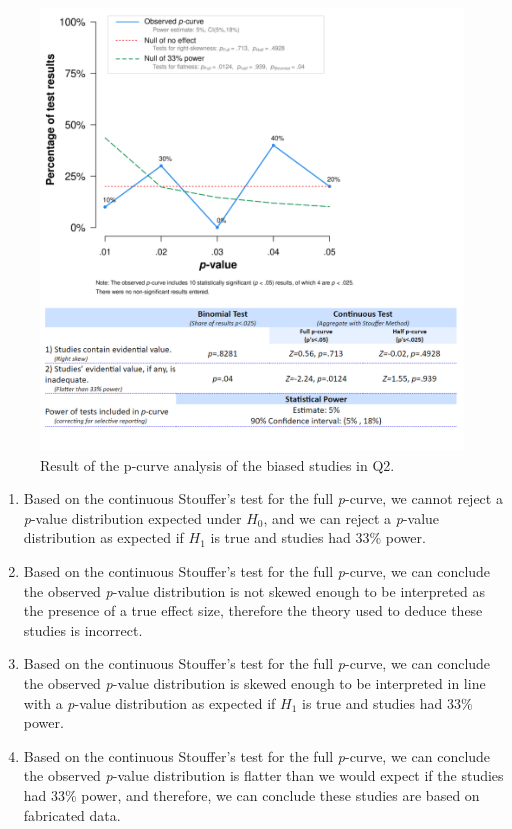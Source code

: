 \documentclass[
  oneside]{krantz}
\providecommand{\tightlist}{%
  \setlength{\itemsep}{0pt}\setlength{\parskip}{0pt}}
\begin{document}
\begin{figure}

{\centering \includegraphics[width=1\linewidth]{images/pcurveresultq5} 

}

\caption{Result of the p-curve analysis of the biased studies in Q2.}\label{fig:pcurveresultq5}
\end{figure}

\begin{enumerate}
\def\labelenumi{\Alph{enumi})}
\tightlist
\item
  Based on the continuous Stouffer's test for the full \emph{p}-curve, we cannot reject a \emph{p}-value distribution expected under \(H_0\), and we can reject a \emph{p}-value distribution as expected if \(H_1\) is true and studies had 33\% power.
\item
  Based on the continuous Stouffer's test for the full \emph{p}-curve, we can
  conclude the observed \emph{p}-value distribution is not skewed enough to be
  interpreted as the presence of a true effect size, therefore the theory used to deduce these studies is incorrect.
\item
  Based on the continuous Stouffer's test for the full \emph{p}-curve, we can
  conclude the observed \emph{p}-value distribution is skewed enough to be
  interpreted in line with a \emph{p}-value distribution as expected if \(H_1\) is true and studies had 33\% power.
\item
  Based on the continuous Stouffer's test for the full \emph{p}-curve, we can
  conclude the observed \emph{p}-value distribution is flatter than we
  would expect if the studies had 33\% power, and therefore, we can conclude these studies are based on fabricated data.
\end{enumerate}
\end{document}
